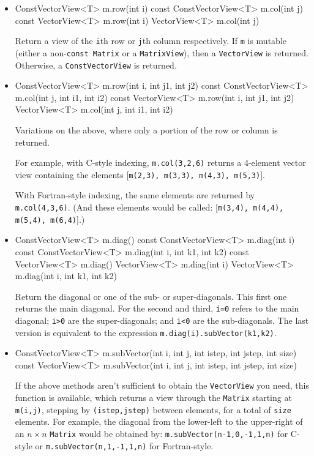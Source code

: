 \documentclass[twoside,letterpaper,11pt]{article}
\renewcommand{\tt}[1]{{\lstinline {#1}}}
\begin{document}
\begin{itemize}
\item
\begin{tmvcode}
ConstVectorView<T> m.row(int i) const
ConstVectorView<T> m.col(int j) const
VectorView<T> m.row(int i)
VectorView<T> m.col(int j)
\end{tmvcode}
Return a view of the \tt{i}th row or \tt{j}th column respectively.
If \tt{m} is mutable (either a non-\tt{const Matrix} or a \tt{MatrixView}),
then a \tt{VectorView} is returned.  Otherwise, a \tt{ConstVectorView}
is returned.

\item
\begin{tmvcode}
ConstVectorView<T> m.row(int i, int j1, int j2) const
ConstVectorView<T> m.col(int j, int i1, int i2) const
VectorView<T> m.row(int i, int j1, int j2)
VectorView<T> m.col(int j, int i1, int i2) 
\end{tmvcode}
Variations on the above, where only a portion of the row or column
is returned.  

For example, with C-style indexing, \tt{m.col(3,2,6)} returns a 4-element
vector view containing the elements
[\tt{m(2,3), m(3,3), m(4,3), m(5,3)}].

With Fortran-style indexing, the same elements are returned by \tt{m.col(4,3,6)}. 
(And these elements would be called: [\tt{m(3,4), m(4,4), m(5,4), m(6,4)}].)

\item
\begin{tmvcode}
ConstVectorView<T> m.diag() const
ConstVectorView<T> m.diag(int i) const 
ConstVectorView<T> m.diag(int i, int k1, int k2) const
VectorView<T> m.diag()
VectorView<T> m.diag(int i)
VectorView<T> m.diag(int i, int k1, int k2)
\end{tmvcode}
Return the diagonal or one of the sub- or super-diagonals.
This first one returns the main diagonal.  For the second and third,
\tt{i=0} refers to the main diagonal; \tt{i>0} are the super-diagonals;
and \tt{i<0} are the sub-diagonals.  The last version is equivalent to the
expression 
\tt{m.diag(i).subVector(k1,k2)}.
\item
\begin{tmvcode}
ConstVectorView<T> m.subVector(int i, int j, int istep, int jstep, 
      int size) const
VectorView<T> m.subVector(int i, int j, int istep, int jstep, int size) 
\end{tmvcode}
If the above methods aren't sufficient to obtain the \tt{VectorView} you
need, this function is available, which returns a view through the \tt{Matrix} 
starting at \tt{m(i,j)}, stepping by \tt{(istep,jstep)} between elements,
for a total of \tt{size} elements.  For example, the diagonal
from the lower-left to the upper-right of an $n \times n$ \tt{Matrix} 
would be obtained by: \tt{m.subVector(n-1,0,-1,1,n)} for C-style or
\tt{m.subVector(n,1,-1,1,n)} for Fortran-style.

\end{itemize}
\end{document}
